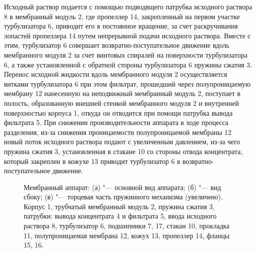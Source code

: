 Исходный раствор подается с помощью подводящего патрубка исходного раствора 8 в мембранный модуль 2, где пропеллер 14, закрепленный на первом участке турбулизатора 6, приводит его в постоянное вращение, за счет раскручивания лопастей пропеллера 14 путем непрерывной подачи исходного раствора. 
Вместе с этим, турбулизатор 6 совершает возвратно-поступательное движение вдоль мембранного модуля 2 за счет винтовых спиралей на поверхности турбулизатора 6, а также установленной с обратной стороны турбулизатора 6 пружины сжатия 3.
Перенос исходной жидкости вдоль мембранного модуля 2 осуществляется витками турбулизатора 6 при этом фильтрат, прошедший через полупроницаемую мембрану 12 нанесенную на неподвижный мембранный модуль 2, поступает в полость, образованную внешней стенкой мембранного модуля 2 и внутренней поверхностью корпуса 1, откуда он отводится при помощи патрубка вывода фильтрата 5. 
При снижении производительности аппарата в ходе процесса разделения, из-за снижения проницаемости полупроницаемой мембраны 12 новый поток исходного раствора подают с увеличенным давлением, из-за чего пружина сжатия 3, установленная в стакане 10 со стороны отвода концентрата, который закреплен в кожухе 13 приводит турбулизатор 6 в возвратно-поступательное движение. 

\begin{figure}[!htb]
\centering
\begin{small}
\begin{subfigure}[htb]{\linewidth}
\centering
\def\svgwidth{12cm}

\caption{}
\label{fig:main_view_membrane1}
\end{subfigure}
\quad
\begin{subfigure}[htb]{0.45\linewidth}
\centering
\def\svgwidth{7cm}

\caption{}
\label{fig:main_view_membrane2}
\end{subfigure}
\quad
\begin{subfigure}[htb]{0.45\linewidth}
\centering
\def\svgwidth{7cm}

\caption{}
\label{fig:main_view_membrane3}
\end{subfigure}
\end{small}
\caption[Мембранный аппарат]{Мембранный аппарат: (а) "--- основной вид аппарата; (б) "--- вид сбоку; (в) "--- торцевая часть пружинного механизма (увеличено).
Корпус 1, трубчатый мембранный модуль 2, пружина сжатия 3, патрубки: вывода концентрата 4 и фильтрата 5, ввода исходного раствора 8, турбулизатор 6, подшипники 7, 17, стакан 10, прокладка 11, полупроницаемая мембрана 12, кожух 13, пропеллер 14, фланцы 15, 16.}
\label{fig:patent_membrane_ap}
\end{figure}


